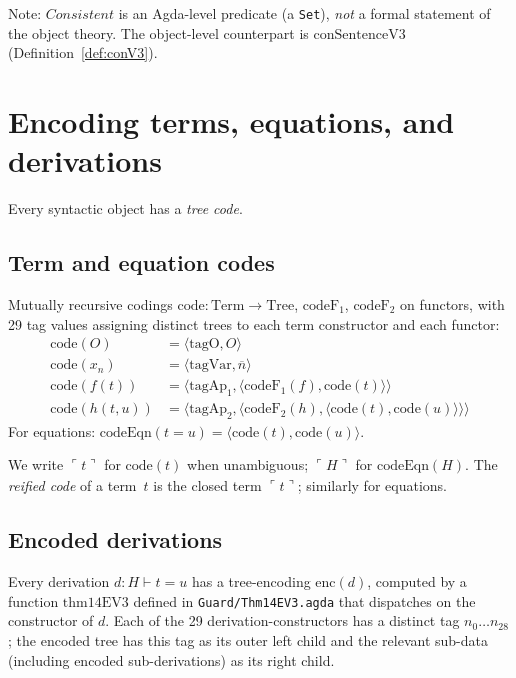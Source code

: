 \documentclass[11pt]{article}
\newcommand{\pair}[2]{\langle #1, #2 \rangle}
\newcommand{\nat}[1]{\overline{#1}}
\newcommand{\code}[1]{\ulcorner #1 \urcorner}
\newcommand{\reify}[1]{\widehat{#1}}
\begin{document}
Note: $\mathit{Consistent}$ is an Agda-level predicate (a \verb|Set|),
\emph{not} a formal statement of the object theory.  The object-level
counterpart is $\mathrm{conSentenceV3}$ (Definition~\ref{def:conV3}).

\section{Encoding terms, equations, and derivations}
\label{sec:encoding}

Every syntactic object has a \emph{tree code}.

\subsection{Term and equation codes}

Mutually recursive codings $\mathrm{code} : \mathrm{Term} \to \mathrm{Tree}$,
$\mathrm{codeF}_1$, $\mathrm{codeF}_2$ on functors, with 29 tag
values assigning distinct trees to each term constructor and each
functor:
\begin{align*}
  \mathrm{code}(O) &= \pair{\mathrm{tagO}}{O} \\
  \mathrm{code}(x_n) &= \pair{\mathrm{tagVar}}{\nat{n}} \\
  \mathrm{code}(f(t)) &= \pair{\mathrm{tagAp_1}}{\pair{\mathrm{codeF}_1(f)}{\mathrm{code}(t)}} \\
  \mathrm{code}(h(t,u)) &= \pair{\mathrm{tagAp_2}}{\pair{\mathrm{codeF}_2(h)}{\pair{\mathrm{code}(t)}{\mathrm{code}(u)}}}
\end{align*}
For equations: $\mathrm{codeEqn}(t = u) = \pair{\mathrm{code}(t)}{\mathrm{code}(u)}$.

We write $\code{t}$ for $\mathrm{code}(t)$ when unambiguous;
$\code{H}$ for $\mathrm{codeEqn}(H)$.
The \emph{reified code} of a term~$t$ is the closed term
$\reify{\code{t}}$; similarly for equations.

\subsection{Encoded derivations}

Every derivation $d : H \vdash t = u$ has a tree-encoding
$\mathrm{enc}(d)$, computed by a function $\mathrm{thm14EV3}$
defined in \verb|Guard/Thm14EV3.agda| that dispatches on the
constructor of $d$.  Each of the 29 derivation-constructors has a
distinct tag $n_0 \ldots n_{28}$; the encoded tree has this tag as
its outer left child and the relevant sub-data (including encoded
sub-derivations) as its right child.
\end{document}
